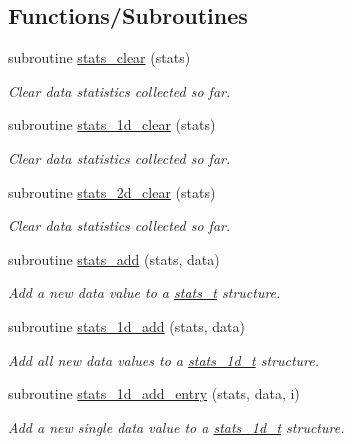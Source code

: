 \subsection*{Functions/\+Subroutines}
\begin{DoxyCompactItemize}
\item 
subroutine \mbox{\hyperlink{namespacepmc__stats_ac5750dcd5d754124f53223d4072344c1}{stats\+\_\+clear}} (stats)
\begin{DoxyCompactList}\small\item\em Clear data statistics collected so far. \end{DoxyCompactList}\item 
subroutine \mbox{\hyperlink{namespacepmc__stats_ac0cd9c69e90ebd760939ce802a889f94}{stats\+\_\+1d\+\_\+clear}} (stats)
\begin{DoxyCompactList}\small\item\em Clear data statistics collected so far. \end{DoxyCompactList}\item 
subroutine \mbox{\hyperlink{namespacepmc__stats_a4416bf7fadf595f6954554bcda94f144}{stats\+\_\+2d\+\_\+clear}} (stats)
\begin{DoxyCompactList}\small\item\em Clear data statistics collected so far. \end{DoxyCompactList}\item 
subroutine \mbox{\hyperlink{namespacepmc__stats_a09e09f5a5169acdc4fbeb28b83586fa5}{stats\+\_\+add}} (stats, data)
\begin{DoxyCompactList}\small\item\em Add a new data value to a {\ttfamily \mbox{\hyperlink{structpmc__stats_1_1stats__t}{stats\+\_\+t}}} structure. \end{DoxyCompactList}\item 
subroutine \mbox{\hyperlink{namespacepmc__stats_a39445eed819e5c2e7fdd867855e23fc6}{stats\+\_\+1d\+\_\+add}} (stats, data)
\begin{DoxyCompactList}\small\item\em Add all new data values to a {\ttfamily \mbox{\hyperlink{structpmc__stats_1_1stats__1d__t}{stats\+\_\+1d\+\_\+t}}} structure. \end{DoxyCompactList}\item 
subroutine \mbox{\hyperlink{namespacepmc__stats_a4e469252e2fa292137c09f0a86fcafc7}{stats\+\_\+1d\+\_\+add\+\_\+entry}} (stats, data, i)
\begin{DoxyCompactList}\small\item\em Add a new single data value to a {\ttfamily \mbox{\hyperlink{structpmc__stats_1_1stats__1d__t}{stats\+\_\+1d\+\_\+t}}} structure. \end{DoxyCompactList}\item 

\end{DoxyCompactItemize}
